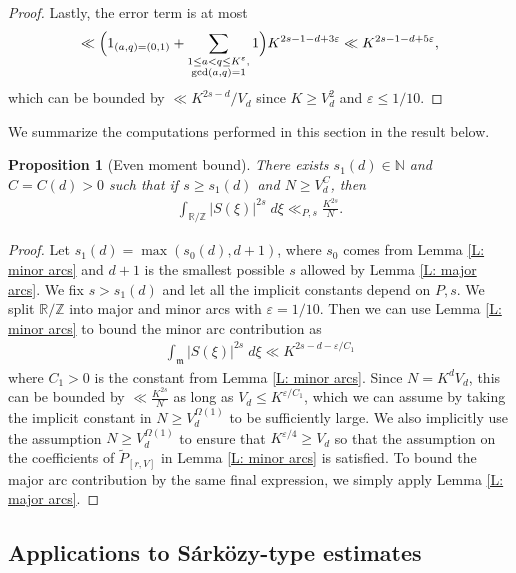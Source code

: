 \documentclass[11pt]{amsart}
\newtheorem{proposition}[lemma]{Proposition}
\theoremstyle{definition}
\newcommand{\N}{{\mathbb N}}
\newcommand{\R}{{\mathbb R}}
\newcommand{\Z}{{\mathbb Z}}
\newcommand{\veps}{\varepsilon}
\newcommand{\Bigbrac}[1]{\Bigl( #1 \Bigr)}
\begin{document}
\begin{proof}
Lastly, the error term is at most
\begin{align*}
    \ll\Bigbrac{1_{(a,q)=(0,1)} + \sum_{\substack{1\leq a < q\leq K^\veps,\\ \gcd(a,q) = 1}}1}K^{2s-1-d+3\veps}\ll K^{2s-1-d+5\veps},
\end{align*}
which can be bounded by $\ll K^{2s-d}/V_d$ since $K\geq V_d^2$ and $\veps\leq 1/10$. 
\end{proof}
We summarize the computations performed in this section in the result below.
\begin{proposition}[Even moment bound]\label{P: even moment bound}
    There exists $s_1(d)\in\N$ and $C=C(d)>0$ such that if $s\geq s_1(d)$ and $N\geq V_d^{C}$, then
        \begin{align*}
        \int_{\R/\Z}|S(\xi)|^{2s}\; d\xi \ll_{P, s} \frac{K^{2s}}{N}.
    \end{align*}
\end{proposition} 
\begin{proof}
    Let $s_1(d) = \max(s_0(d), d+1)$, where $s_0$ comes from Lemma \ref{L: minor arcs} and $d+1$ is the smallest possible $s$ allowed by Lemma \ref{L: major arcs}. We fix $s>s_1(d)$ and let all the implicit constants depend on $P, s$.
    We split $\R/\Z$ into major and minor arcs with  $\veps = 1/10$.
    Then we can use Lemma \ref{L: minor arcs} to bound the minor arc contribution as 
    \begin{align*}
        \int_{\mathfrak{m}}|S(\xi)|^{2s}\; d\xi \ll K^{2s-d-\veps/C_1} 
    \end{align*}
    where $C_1>0$ is the constant from Lemma \ref{L: minor arcs}. Since $N = K^d V_d$, this can be bounded by $\ll \frac{K^{2s}}{N}$ as long as $V_d\leq K^{\veps/C_1}$, which we can assume by taking the implicit constant in $N\geq V_d^{\Omega(1)}$ to be sufficiently large. We also implicitly use the assumption $N\geq V_d^{\Omega(1)}$ to ensure that $K^{\veps/4}\geq V_d$ so that the assumption on the coefficients of $\widetilde{P}_{[r, V]}$ in Lemma \ref{L: minor arcs} is satisfied. To bound the major arc contribution by the same final expression, we simply apply Lemma \ref{L: major arcs}.

    
\end{proof}

\subsection{Applications to S\'ark\"ozy-type estimates}
\end{document}
